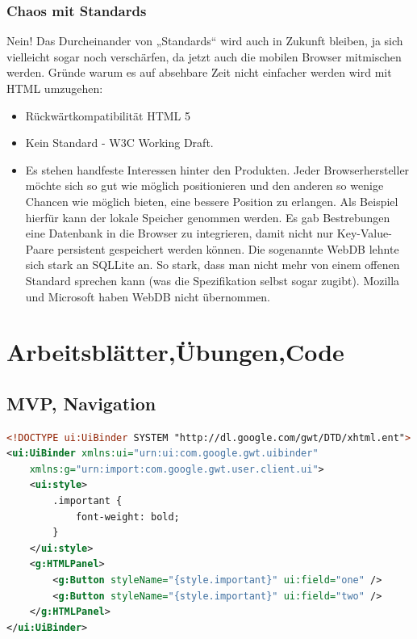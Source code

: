 \documentclass[a4paper,10pt]{scrreprt}
\begin{document}
\section{Chaos mit Standards}
Nein! Das Durcheinander von „Standards“ wird auch in Zukunft bleiben, ja sich vielleicht sogar
noch verschärfen, da jetzt auch die mobilen Browser mitmischen werden. Gründe warum es auf
absehbare Zeit nicht einfacher werden wird mit HTML umzugehen:
\begin{itemize}
 \item Rückwärtkompatibilität HTML 5
 \item Kein Standard - W3C Working Draft.
 \item Es stehen handfeste Interessen hinter den Produkten. Jeder Browserhersteller möchte sich
so gut wie möglich positionieren und den anderen so wenige Chancen wie möglich bieten,
eine bessere Position zu erlangen. Als Beispiel hierfür kann der lokale Speicher genommen
werden. Es gab Bestrebungen eine Datenbank in die Browser zu integrieren, damit nicht nur
Key-Value-Paare persistent gespeichert werden können. Die sogenannte WebDB lehnte sich
stark an SQLLite an. So stark, dass man nicht mehr von einem offenen Standard sprechen
kann (was die Spezifikation selbst sogar zugibt). Mozilla und Microsoft haben WebDB nicht
übernommen.
\end{itemize}
\part{Arbeitsblätter,Übungen,Code}
\chapter{MVP, Navigation}




\begin{lstlisting}[caption=WelcomeView xml,language=xml]
 <!DOCTYPE ui:UiBinder SYSTEM "http://dl.google.com/gwt/DTD/xhtml.ent">
<ui:UiBinder xmlns:ui="urn:ui:com.google.gwt.uibinder"
	xmlns:g="urn:import:com.google.gwt.user.client.ui">
	<ui:style>
		.important {
			font-weight: bold;
		}
	</ui:style>
	<g:HTMLPanel>
		<g:Button styleName="{style.important}" ui:field="one" />
		<g:Button styleName="{style.important}" ui:field="two" />
	</g:HTMLPanel>
</ui:UiBinder> 
\end{lstlisting}



\end{document}
